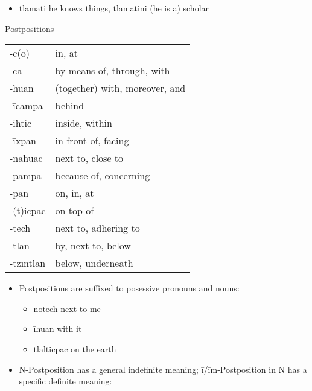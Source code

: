 \documentclass[12pt]{beamer}
\newcommand{\nah}[1]{\textcolor{nahgrn}{#1}}
\newcommand{\trs}[1]{\textcolor{nahblu}{#1}}
\begin{document}
\begin{frame}
\begin{columns}[t]
\begin{column}{.20\linewidth}
\begin{example}
\begin{itemize}
      		\item \nah{tlamati} \trs{he knows things}, \nah{tlamatini} \trs{(he is a) scholar}
      	\end{itemize}
      \end{example}
      \begin{block}{Postpositions}
        \begin{tabular}{ll}
          \nah{-c(o)}     & \trs{in, at}                         \\
          \nah{-ca}       & \trs{by means of, through, with}     \\
          \nah{-huān}     & \trs{(together) with, moreover, and} \\
          \nah{-īcampa}   & \trs{behind}                         \\
          \nah{-ihtic}    & \trs{inside, within}                 \\
          \nah{-īxpan}    & \trs{in front of, facing}            \\
          \nah{-nāhuac}   & \trs{next to, close to}              \\
          \nah{-pampa}    & \trs{because of, concerning}         \\
          \nah{-pan}      & \trs{on, in, at}                     \\
          \nah{-(t)icpac} & \trs{on top of}                      \\
          \nah{-tech}     & \trs{next to, adhering to}           \\
          \nah{-tlan}     & \trs{by, next to, below}             \\
          \nah{-tzīntlan} & \trs{below, underneath}              \\
        \end{tabular}%
        \begin{itemize}
          \item Postpositions are suffixed to posessive pronouns and nouns:
                \begin{itemize}
                  \item \nah{notech} \trs{next to me}
                  \item \nah{īhuan} \trs{with it}
                  \item \nah{tlalticpac} \trs{on the earth}
                \end{itemize}
          \item N-Postposition has a general indefinite meaning; \nah{ī/īm}-Postposition \nah{in} N has a specific definite meaning:

\end{itemize}
\end{block}
\end{column}
\end{columns}
\end{frame}
\end{document}
